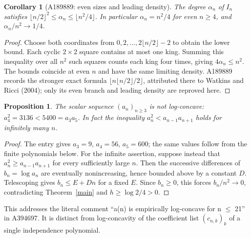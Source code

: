 \documentclass[10pt]{article}
\newtheorem{corollary}[theorem]{Corollary}
\newtheorem{proposition}[theorem]{Proposition}
\begin{document}
\begin{corollary}[A189889: even sizes and leading density]\label{packing}
The degree $\alpha_n$ of $I_n$ satisfies
$\lfloor n/2\rfloor^2\leq\alpha_n\leq\lfloor n^2/4\rfloor$.
In particular $\alpha_n=n^2/4$ for even $n\geq4$, and
$\alpha_n/n^2\to1/4$.
\end{corollary}
\begin{proof}
Choose both coordinates from $0,2,\ldots,2\lfloor n/2\rfloor-2$
to obtain the lower bound. Each cyclic $2\times2$ square contains
at most one king. Summing this inequality over all $n^2$ such
squares counts each king four times, giving $4\alpha_n\leq n^2$.
The bounds coincide at even $n$ and have the same limiting density.
A189889~\cite{capacity} records the stronger exact formula
$\lfloor n\lfloor n/2\rfloor/2\rfloor$, attributed there to
Watkins and Ricci (2004); only its even branch and leading density
are reproved here.
\end{proof}

\begin{proposition}\label{logconcavity}
The scalar sequence $(a_n)_{n\geq3}$ is not log-concave:
$a_4^2=3136<5400=a_3a_5$. In fact the inequality
$a_n^2<a_{n-1}a_{n+1}$ holds for infinitely many $n$.
\end{proposition}
\begin{proof}
The entry gives $a_3=9$, $a_4=56$, $a_5=600$; the same values
follow from the finite polynomials below. For the infinite assertion,
suppose instead that $a_n^2\geq a_{n-1}a_{n+1}$ for every sufficiently
large $n$. Then the successive differences of $b_n=\log a_n$ are
eventually nonincreasing, hence bounded above by a constant $D$.
Telescoping gives $b_n\leq E+Dn$ for a fixed $E$. Since $b_n\geq0$,
this forces $b_n/n^2\to0$, contradicting
Theorem~\ref{main} and $h\geq\log2/4>0$.
\end{proof}

This addresses the literal comment ``a(n) is empirically log-concave
for n $\leq$ 21'' in A394697. It is
distinct from log-concavity of the coefficient list $(c_{n,k})_k$
of a single independence polynomial.
\end{document}
